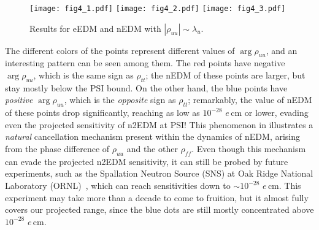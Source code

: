 \begin{figure}[p]
  \centering
  \texttt{[image: fig4\_1.pdf]}
  \texttt{[image: fig4\_2.pdf]}
  \texttt{[image: fig4\_3.pdf]}
  \caption{Results for eEDM and nEDM with \(|\rho_{uu}| \sim \lambda_{u}\).}
  \label{fig:nEDM-varied}
\end{figure}

The different colors of the points represent different values of \(\arg\rho_{uu} \), and an interesting pattern can be seen among them.
The red points have negative \(\arg\rho_{uu} \), which is the same sign as \(\rho_{tt} \); 
the nEDM of these points are larger, but stay mostly below the PSI bound.
On the other hand, the blue points have \textit{positive} \(\arg\rho_{uu} \), which is the \textit{opposite} sign as \(\rho_{tt} \); 
remarkably, the value of nEDM of these points drop significantly, reaching as low as \(10^{-28} \) \(e\,\mathrm{cm} \) or lower, 
evading even the projected sensitivity of n2EDM at PSI!
This phenomenon in  illustrates a \textit{natural} cancellation mechanism present within the dynamics of nEDM,
arising from the phase difference of \(\rho_{uu} \) and the other \(\rho_{ff} \).
Even though this mechanism can evade the projected n2EDM sensitivity, it can still be probed by future experiments, such as the Spallation Neutron Source (SNS) at Oak Ridge National Laboratory (ORNL)~\cite{SNS-ORNL}, which can reach sensitivities down to \(\sim 10^{-28} \) \(e\,\mathrm{cm} \).
This experiment may take more than a decade to come to fruition, but it almost fully covers our projected range, since the blue dots are still mostly concentrated above \(10^{-28} \) \(e\,\mathrm{cm} \).